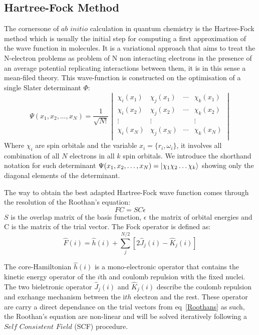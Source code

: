 \documentclass{article}
\begin{document}
\subsection{Hartree-Fock Method}
The cornersone of $ab$ $initio$ calculation in quantum chemistry is the Hartree-Fock method which is usually the initial step for computing a first approximation of the wave function in molecules. 
It is a variational approach that aims to treat the N-electron problems as problem of N non interacting electrons in the presence of an average potential replicating interactions between them, it is in this sense a mean-filed theory.
This wave-function is constructed on the optimisation of a single Slater determinant $\Phi$:
\begin{equation}
    \Psi(x_1,x_2,\ldots,x_N)=\frac{1}{\sqrt{N!}}
    \begin{vmatrix}
        \chi_i (x_1) & \chi_j (x_1) & \cdots & \chi_k (x_1)\\
        \chi_i (x_2) & \chi_j (x_2) & \cdots & \chi_k (x_2)\\
        \vdots & \vdots &   &  \vdots\\
        \chi_i (x_N) & \chi_j (x_N) & \cdots & \chi_k (x_N)\\
    \end{vmatrix}
\end{equation}
Where $\chi_i$ are spin orbitals and the variable $x_i=\{r_i,\omega_i\}$, it involves all combination of all $N$ electrons in all $k$ spin orbitals. 
We introduce the shorthand notation for such determinant $\Psi(x_1,x_2,\ldots,x_N)=\ket{\chi_1\chi_2\ldots\chi_k}$ showing only the diagonal elements of the determinant.

The way to obtain the best adapted Hartree-Fock wave function comes through the resolution of the Roothan's equation:
\begin{equation}\label{Roothans}
    FC=SC\epsilon
\end{equation}
$S$ is the overlap matrix of the basis function, $\epsilon$ the matrix of orbital energies and C is the matrix of the trial vector.
The Fock operator is defined as:
\begin{equation}
    \hat{F}(i)=\hat{h}(i)+\sum_{j}^{N/2}[2\hat{J}_{j}(i)-\hat{K}_{j}(i)]
\end{equation}

The core-Hamiltonian $\hat{h}(i)$ is a mono-electronic operator that contains the kinetic energy operator of the $i$th and coulomb repulsion with the fixed nuclei. 
The two bieletronic operator $\hat{J}_{j}(i)$ and $\hat{K}_{j}(i)$ describe the coulomb repulsion and exchange mechanism between the i$th$ electron and the rest.
These operator are carry a direct dependance on the trial vectors from eq~\ref{Roothans} as such, the Roothan's equation are non-linear and will be solved iteratively following a $Self$ $Consistent$ $Field$ (SCF) procedure.
\end{document}
